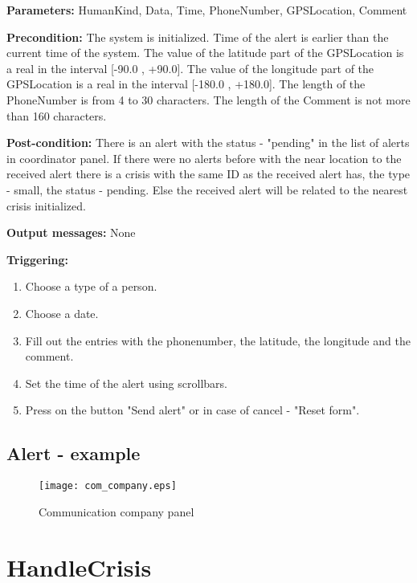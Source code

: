\begin{description}
	\item \textbf{Parameters:} HumanKind, Data, Time, PhoneNumber, GPSLocation,
	Comment
	\item \textbf{Precondition:} The system is initialized. Time of the alert is
	earlier than the current time of the system. The value of the latitude part
	of the GPSLocation is a real in the interval [-90.0 , +90.0]. The value of the longitude part
	of the GPSLocation is a	real in the interval [-180.0 , +180.0]. The length of
	the PhoneNumber is from 4 to 30 characters. The length of the Comment is
	not more than 160 characters.
	\item \textbf{Post-condition:} There is an alert with the status - "pending" in
	the list of alerts in coordinator panel. If there were no alerts before with the
	near location to the received alert there is a crisis with
	the same ID as the received alert has, the type - small, the status - pending.
	Else the received alert will be related to the nearest crisis initialized. 
	\item \textbf{Output messages:} None
	
	\item \textbf{Triggering:}
	
	\begin{enumerate}
		\item Choose a type of a person.
		\item Choose a date.
		\item Fill out the entries with the phonenumber, the latitude, the longitude
		and the comment.
		\item Set the time of the alert using scrollbars.
		\item Press on the button "Send alert" or in case of cancel - "Reset form".
	\end{enumerate}
\end{description}

\subsection{Alert - example}

\begin{figure}
    \texttt{[image: com\_company.eps]}
	\caption{Communication company panel}
\end{figure}


\section{HandleCrisis}
\label{operation:HandleCrisis}

